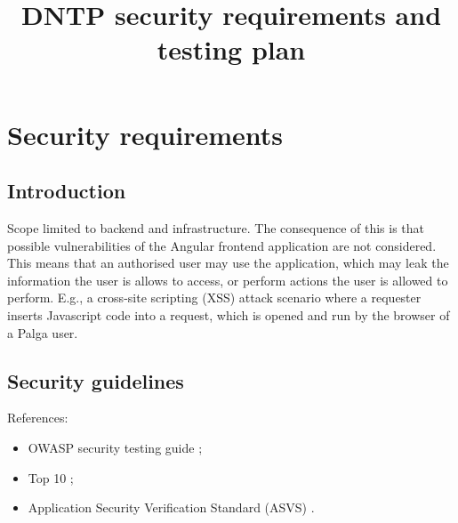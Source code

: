 \documentclass{report}
\title{DNTP security requirements and testing plan}
\begin{document}
\chapter{Security requirements}

\section{Introduction}
Scope limited to backend and infrastructure.
The consequence of this is that possible vulnerabilities of the
Angular frontend application are not considered.
This means that an authorised user may use the application, which
may leak the information the user is allows to access, or perform
actions the user is allowed to perform. E.g., a cross-site scripting
(XSS) attack scenario where a requester inserts Javascript code into
a request, which is opened and run by the browser of a Palga user.

\section{Security guidelines}

References:
\begin{itemize}

\item OWASP security testing guide \cite{owasp2013:testing};
\item Top 10 \cite{owasp2013:top10};
\item Application Security Verification Standard (ASVS) \cite{owasp2014:asvs}.
\end{itemize}
\end{document}
